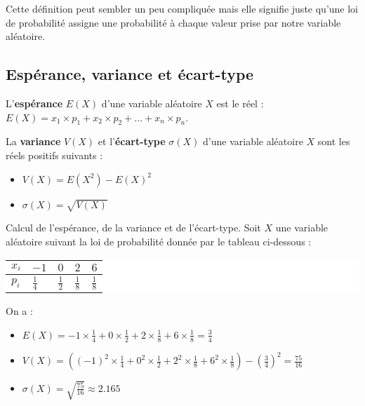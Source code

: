 	\begin{tip}
		Cette définition peut sembler un peu compliquée mais elle signifie juste qu'une loi de probabilité assigne une probabilité à chaque valeur prise par notre variable aléatoire.
	\end{tip}

	\subsection{Espérance, variance et écart-type}

	\begin{formula}[Espérance]
		L'\textbf{espérance} $E(X)$ d'une variable aléatoire $X$ est le réel :
		$E(X) = x_1 \times p_1 + x_2 \times p_2 + \dots + x_n \times p_n$.
	\end{formula}

	\begin{formula}
		La \textbf{variance} $V(X)$ et l'\textbf{écart-type} $\sigma(X)$ d'une variable aléatoire $X$ sont les réels positifs suivants :
		\begin{itemize}
			\item $V(X) = E(X^2) - E(X)^2$
			\item $\sigma(X) = \sqrt{V(X)}$
		\end{itemize}
	\end{formula}

	\begin{tip}[Exemple]
		Calcul de l'espérance, de la variance et de l'écart-type. Soit $X$ une variable aléatoire suivant la loi de probabilité donnée par le tableau ci-dessous :
		\newpar
		\colorbox{white}{%
			\begin{tabularx}{\textwidth}{|X|X|X|X|X|}
				\hline
				$x_i$ & $-1$ & $0$ & $2$ & $6$ \\
				\hline
				$p_i$ & $\frac{1}{4}$ & $\frac{1}{2}$ & $\frac{1}{8}$ & $\frac{1}{8}$ \\
				\hline
			\end{tabularx}%
		}
		\newpar
		On a :
		\begin{itemize}
			\item $E(X) = -1 \times \frac{1}{4} + 0 \times \frac{1}{2} + 2 \times \frac{1}{8} + 6 \times \frac{1}{8} = \frac{3}{4}$
			\item $V(X) = ((-1)^2 \times \frac{1}{4} + 0^2 \times \frac{1}{2} + 2^2 \times \frac{1}{8} + 6^2 \times \frac{1}{8}) - (\frac{3}{4})^2 = \frac{75}{16}$
			\item $\sigma(X) = \sqrt{\frac{75}{16}} \approx 2.165$
		\end{itemize}
	\end{tip}

